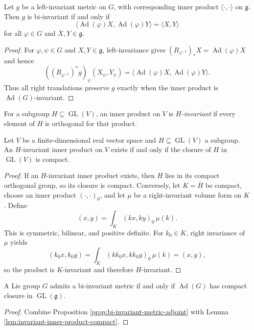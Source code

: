 \begin{proposition}
\label{prop:bi-invariant-metric-adjoint}

Let $g$ be a left-invariant metric on $G$, with corresponding inner product
$\langle\cdot,\cdot\rangle$ on $\mathfrak g$. Then $g$ is bi-invariant if and
only if
\[
\langle\operatorname{Ad}(\varphi)X,\operatorname{Ad}(\varphi)Y\rangle
=\langle X,Y\rangle
\]
for all $\varphi\in G$ and $X,Y\in\mathfrak g$.
\end{proposition}
\begin{proof}
\sketch For $\varphi,\psi\in G$ and $X,Y\in\mathfrak g$, left-invariance gives
$(R_{\varphi^{-1}})_*X=\operatorname{Ad}(\varphi)X$ and hence
\[
((R_{\varphi^{-1}})^*g)_\psi(X_\psi,Y_\psi)
=\langle\operatorname{Ad}(\varphi)X,
\operatorname{Ad}(\varphi)Y\rangle.
\]
Thus all right translations preserve $g$ exactly when the inner product is
$\operatorname{Ad}(G)$-invariant.
\end{proof}

For a subgroup $H\subseteq\operatorname{GL}(V)$, an inner product on $V$ is
\emph{$H$-invariant} if every element of $H$ is orthogonal for that product.

\begin{lemma}
\label{lem:invariant-inner-product-compact}
Let $V$ be a finite-dimensional real vector space and
$H\subseteq\operatorname{GL}(V)$ a subgroup. An $H$-invariant inner product on
$V$ exists if and only if the closure of $H$ in $\operatorname{GL}(V)$ is
compact.
\end{lemma}
\begin{proof}
\sketch If an $H$-invariant inner product exists, then $H$ lies in its compact
orthogonal group, so its closure is compact. Conversely, let $K=\overline H$ be
compact, choose an inner product $(\cdot,\cdot)_0$, and let $\mu$ be a
right-invariant volume form on $K$. Define
\[
(x,y)=\int_K(kx,ky)_0\,\mu(k).
\]
This is symmetric, bilinear, and positive definite. For $k_0\in K$, right
invariance of $\mu$ yields
\[
(k_0x,k_0y)=\int_K(kk_0x,kk_0y)_0\,\mu(k)=(x,y),
\]
so the product is $K$-invariant and therefore $H$-invariant.
\end{proof}

\begin{theorem}
\label{thm:existence-bi-invariant-metrics}
A Lie group $G$ admits a bi-invariant metric if and only if
$\operatorname{Ad}(G)$ has compact closure in
$\operatorname{GL}(\mathfrak g)$.
\end{theorem}
\begin{proof}
\sketch Combine Proposition \ref{prop:bi-invariant-metric-adjoint} with Lemma
\ref{lem:invariant-inner-product-compact}.
\end{proof}

